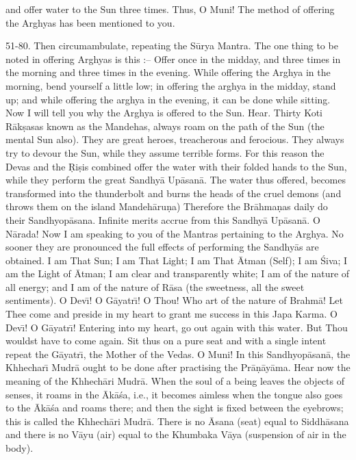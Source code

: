 and offer water to the Sun three times. Thus, O Muni! The method of offering the Arghyas has been mentioned to you.

51-80. Then circumambulate, repeating the S\=urya Mantra. The one thing to be noted in offering Arghyas is this :-- Offer once in the midday, and three times in the morning and three times in the evening. While offering the Arghya in the morning, bend yourself a little low; in offering the arghya in the midday, stand up; and while offering the arghya in the evening, it can be done while sitting. Now I will tell you why the Arghya is offered to the Sun. Hear. Thirty Koti R\=ak\d{s}asas known as the Mandehas, always roam on the path of the Sun (the mental Sun also). They are great heroes, treacherous and ferocious. They always try to devour the Sun, while they assume terrible forms. For this reason the Devas and the \d{R}i\d{s}is combined offer the water with their folded hands to the Sun, while they perform the great Sandhy\=a Up\=asan\=a. The water thus offered, becomes transformed into the thunderbolt and burns the heads of the cruel demons (and throws them on the island Mandeh\=aru\d{n}a) Therefore the Br\=ahma\d{n}as daily do their Sandhyop\=asana. Infinite merits accrue from this Sandhy\=a Up\=asan\=a. O N\=arada! Now I am speaking to you of the Mantras pertaining to the Arghya. No sooner they are pronounced the full effects of performing the Sandhy\=as are obtained. I am That Sun; I am That Light; I am That \=Atman (Self); I am \'Siva; I am the Light of \=Atman; I am clear and transparently white; I am of the nature of all energy; and I am of the nature of R\=asa (the sweetness, all the sweet sentiments). O Dev\={\i}! O G\=ayatr\={\i}! O Thou! Who art of the nature of Brahm\=a! Let Thee come and preside in my heart to grant me success in this Japa Karma. O Dev\={\i}! O G\=ayatr\={\i}! Entering into my heart, go out again with this water. But Thou wouldst have to come again. Sit thus on a pure seat and with a single intent repeat the G\=ayatr\={\i}, the Mother of the Vedas. O Muni! In this Sandhyop\=asan\=a, the Khhechar\={\i} Mudr\=a ought to be done after practising the Pr\=a\d{n}\=ay\=ama. Hear now the meaning of the Khhech\=ari Mudr\=a. When the soul of a being leaves the objects of senses, it roams in the \=Ak\=a\'sa, i.e., it becomes aimless when the tongue also goes to the \=Ak\=a\'sa and roams there; and then the sight is fixed between the eyebrows; this is called the Khhech\=ari Mudr\=a. There is no \=Asana (seat) equal to Siddh\=asana and there is no V\=ayu (air) equal to the Khumbaka V\=aya (suspension of air in the body).


